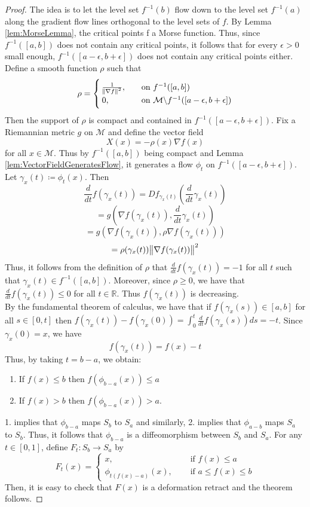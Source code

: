 \documentclass[10pt]{article}
\theoremstyle{plain}
\theoremstyle{definition}
\newcommand{\myif}{\text{ if }}
\newcommand{\Real}{\mathbb{R}}
\newcommand{\man}{\mathcal{M}}
\newcommand{\deriv}{d}
\newcommand{\dt}{\deriv t}
\newcommand{\inter}{\left[0,1\right]}
\newcommand{\mycasesthing}[2]{\begin{cases} #1 \\ #2\end{cases}}
\newcommand{\tdiffof}[1]{\frac{\deriv #1}{\dt}}
\newcommand{\sdiffof}[1]{\frac{\deriv #1}{\dt}}
\begin{document}
\begin{proof}
    The idea is to let the level set $f^{-1}(b)$ flow down to the level set $f^{-1}(a) $ along the gradient flow lines orthogonal to the level sets of $f$. By Lemma \ref{lem:MorseLemma}, the critical points f a Morse function. Thus, since $f^{-1}([a,b])$ does not contain any critical points, it follows that for every $\epsilon >0$ small enough, $f^{-1}([a-\epsilon,b+\epsilon])$ does not contain any critical points either. Define a smooth function $\rho$ such that 
        $$\rho = \mycasesthing{\frac{1}{\norm{\nabla f}^2}, &\quad \text{on } f^{-1}([a,b])}{0,& \quad \text{on } \man \backslash f^{-1}([a-\epsilon,b+\epsilon])}$$
    Then the support of $\rho$ is compact and contained in $f^{-1}([a-\epsilon,b+\epsilon])$. Fix a Riemannian metric $g$ on $\man$ and define the vector field 
        $$X(x) = - \rho(x) \nabla f(x)$$
    for all $x \in \man$. Thus by $f^{-1}([a,b])$ being compact and Lemma \ref{lem:VectorFieldGeneratesFlow}, it generates a flow $\phi_t$ on $f^{-1}([a-\epsilon,b+\epsilon]) $. Let $\gamma_x(t) \coloneqq \phi_t(x)$. Then 
        $$ \tdiffof{}f(\gamma_x(t)) = Df_{\gamma_x(t)} \left(\tdiffof{}\gamma_x(t)\right)$$
        $$= g(\nabla f(\gamma_x(t)), \tdiffof{}\gamma_x(t))$$
        $$= g(\nabla f(\gamma_x(t)),\rho \nabla f(\gamma_x(t)))$$
        $$= \rho(\gamma_x(t)) \norm{\nabla f (\gamma_x(t))}^2$$
    Thus, it follows from the definition of $\rho$ that $\tdiffof{} f(\gamma_x(t) ) = -1$ for all $t $ such that $\gamma_x(t) \in f^{-1}([a,b])$. Moreover, since $\rho \geq 0$, we have that $\tdiffof{} f(\gamma_x(t) ) \leq 0$ for all $t\in \Real$. Thus $f(\gamma_x(t))$ is decreasing.\\
    By the fundamental theorem of calculus, we have that if $f(\gamma_x(s)) \in [a,b]$ for all $s\in [0,t]$ then $f(\gamma_x(t)) - f(\gamma_x(0)) = \int_0 ^t \sdiffof{} f(\gamma_x(s)) \deriv s = -t$. Since $\gamma_x(0) = x$, we have     $$f(\gamma_x(t)) = f(x) - t$$
    Thus, by taking $t = b - a$, we obtain:
    \begin{enumerate}
        \item If $f(x) \leq b$ then $f(\phi_{b-a}(x))\leq a$
        \item If $f(x) > b$ then $f(\phi_{b-a}(x)) > a$.
    \end{enumerate}
    1. implies that $\phi_{b-a}$ maps $S_b$ to $S_a$ and similarly, 2. implies that $\phi_{a-b}$ maps $S_a$ to $S_b$. Thus, it follows that $\phi_{b-a}$ is a diffeomorphism between $S_b$ and $S_a$. For any $t\in\inter$, define $F_t:S_b\to S_a$ by
        $$F_t(x) = \mycasesthing{x,& \quad \myif f(x) \leq a}{\phi_{t(f(x)-a)}(x),&\quad \myif a\leq f(x) \leq b}$$
    Then, it is easy to check that $F(x)$ is a deformation retract and the theorem follows.
\end{proof}
\end{document}

